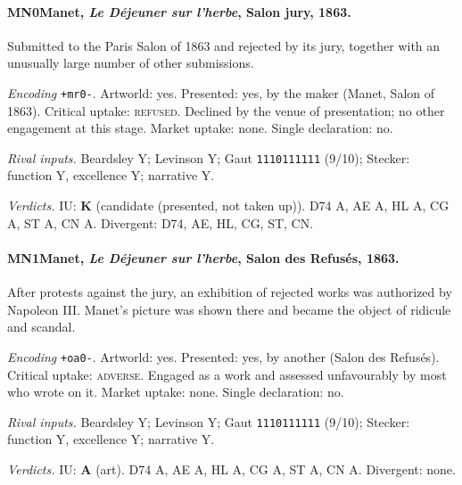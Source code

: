\paragraph{MN0\enspace Manet, \emph{Le D\'ejeuner sur l'herbe}, Salon jury, 1863.}
Submitted to the Paris Salon of 1863 and rejected by its jury, together with an unusually large number of other submissions.\par
\noindent\textit{Encoding} \texttt{+mr0-}. Artworld: yes. Presented: yes, by the maker (Manet, Salon of 1863). Critical uptake: \textsc{refused}. Declined by the venue of presentation; no other engagement at this stage. Market uptake: none. Single declaration: no.\par
\noindent\textit{Rival inputs.} Beardsley Y; Levinson Y; Gaut \texttt{1110111111} (9/10); Stecker: function Y, excellence Y; narrative Y.\par
\noindent\textit{Verdicts.} IU: \textbf{K} (candidate (presented, not taken up)). D74 A, AE A, HL A, CG A, ST A, CN A. Divergent: D74, AE, HL, CG, ST, CN.\par

\paragraph{MN1\enspace Manet, \emph{Le D\'ejeuner sur l'herbe}, Salon des Refus\'es, 1863.}
After protests against the jury, an exhibition of rejected works was authorized by Napoleon III. Manet's picture was shown there and became the object of ridicule and scandal.\par
\noindent\textit{Encoding} \texttt{+oa0-}. Artworld: yes. Presented: yes, by another (Salon des Refus\'es). Critical uptake: \textsc{adverse}. Engaged as a work and assessed unfavourably by most who wrote on it. Market uptake: none. Single declaration: no.\par
\noindent\textit{Rival inputs.} Beardsley Y; Levinson Y; Gaut \texttt{1110111111} (9/10); Stecker: function Y, excellence Y; narrative Y.\par
\noindent\textit{Verdicts.} IU: \textbf{A} (art). D74 A, AE A, HL A, CG A, ST A, CN A. Divergent: none.\par

